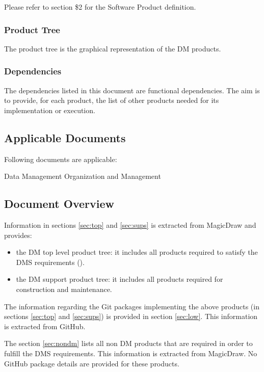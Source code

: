 Please refer to  section \$2 for the Software Product definition.


\subsubsection{Product Tree} \label{sec:ptree}

The product tree is the graphical representation of the DM products.


\subsubsection{Dependencies} \label{sec:dependencies}

The dependencies listed in this document are functional dependencies.
The aim is to provide, for each product, the list of other products needed for its implementation or execution. 


\subsection{Applicable Documents}

Following documents are applicable:

 Data Management Organization and Management\\


\subsection{Document Overview}

Information in sections \ref{sec:top} and \ref{sec:sups} is extracted from MagicDraw and provides:

\begin{itemize}
\item the DM top level product tree: it includes all products required to satisfy the DMS requirements ().
\item the DM support product tree: it includes all products required for construction and maintenance.
\end{itemize}

The information regarding the Git packages implementing the above products (in sections \ref{sec:top} and \ref{sec:sups}) is provided in section \ref{sec:low}. 
This information is extracted from GitHub.

The section \ref{sec:nondm} lists all non DM products that are required in order to fulfill the DMS requirements.
This information is extracted from MagicDraw.
No GitHub package details are provided for these products. 

